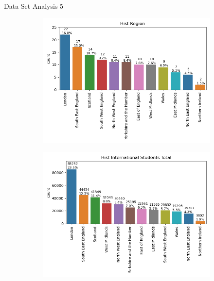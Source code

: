 \documentclass[xcolor=table]{beamer} %
\begin{document}
\begin{frame}{Data Set Analysis 5}
  \vspace{-1.0cm}
  \begin{figure}
      \centering
      
      \begin{subfigure}[b]{0.48\textwidth}
        \centering
        \includegraphics[width=\textwidth, trim={0 0 0 0}, clip]{./figs/bar_hist region.png}
        \label{fig:hist_region}
      \end{subfigure}
      \hfill
      \begin{subfigure}[b]{0.48\textwidth}
          \centering
          \includegraphics[width=\textwidth, trim={0 0 0 0}, clip]{./figs/bar_hist international students total.png}

\end{subfigure}
\end{figure}
\end{frame}
\end{document}
